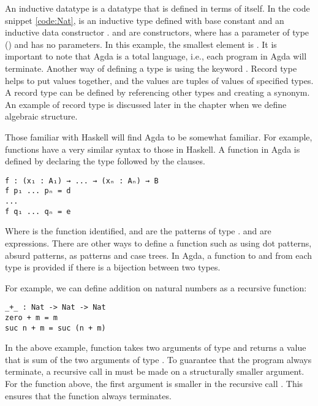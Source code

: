 An inductive datatype is a datatype that is defined in terms of itself. In the
code snippet \ref{code:Nat},  is an inductive type defined with base
constant  and an inductive data constructor .
 and  are constructors, where  has a
parameter of type () and  has no parameters. In this
example, the smallest element is . It is important to note that
Agda is a total language, i.e., each program in Agda will
terminate\cite{kidney2020finiteness}. Another way of defining a type is using
the keyword . Record type helps to put values together, and the
values are tuples of values of specified types. A record type can be defined by
referencing other types and creating a synonym. An example of record type is
discussed later in the chapter when we define algebraic structure.

Those familiar with Haskell will find Agda to be somewhat familiar. For example,
functions have a very similar syntax to those in Haskell. A function in Agda is
defined by declaring the type followed by the clauses. 
\begin{verbatim}
f : (x₁ : A₁) → ... → (xₙ : Aₙ) → B
f p₁ ... pₙ = d
...
f q₁ ... qₙ = e
\end{verbatim} 
Where  is the function identified,  and  are the
patterns of type .  and  are expressions. There
are other ways to define a function such as using dot patterns, absurd patterns,
as patterns and case trees. In Agda, a function to and from each type is
provided if there is a bijection between two types.

For example, we can define addition on natural numbers as a recursive function:
\label{code:Add}
\begin{verbatim}
_+_ : Nat -> Nat -> Nat
zero + m = m
suc n + m = suc (n + m)
\end{verbatim}

In the above example, function \inline{_+_} takes two arguments of type
 and returns a value that is sum of the two arguments of type
. To guarantee that the program always terminate, a recursive call
in must be made on a structurally smaller argument. For the function
\inline{_+_} above, the first argument  is smaller in the recursive
call . This ensures that the function \inline{_+_} always
terminates.

